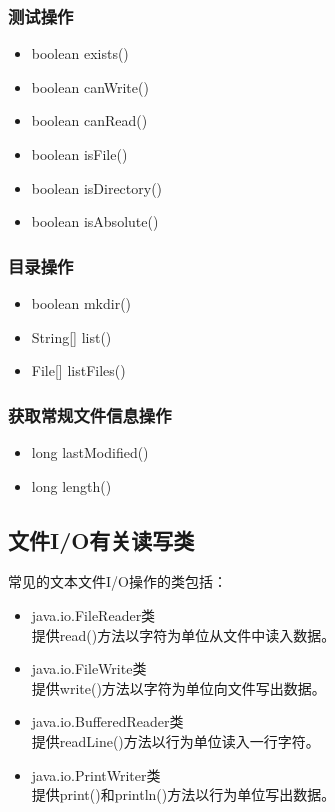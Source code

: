 \subsubsection{测试操作} 

\begin{itemize}
\item boolean exists() 
\item boolean canWrite() 
\item boolean canRead() 
\item boolean isFile() 
\item boolean isDirectory() 
\item boolean isAbsolute()
\end{itemize}

\subsubsection{目录操作}

\begin{itemize}
\item boolean mkdir() 
\item String[] list() 
\item File[] listFiles()
\end{itemize}

\subsubsection{获取常规文件信息操作}

\begin{itemize}
\item long lastModified() 
\item long length()
\end{itemize}


\subsection{文件I/O有关读写类}

常见的文本文件I/O操作的类包括：
\begin{itemize}
\item java.io.FileReader类\\
  提供read()方法以字符为单位从文件中读入数据。
\item java.io.FileWrite类\\
  提供write()方法以字符为单位向文件写出数据。
\item java.io.BufferedReader类\\
  提供readLine()方法以行为单位读入一行字符。
\item java.io.PrintWriter类\\
  提供print()和println()方法以行为单位写出数据。
\end{itemize}


